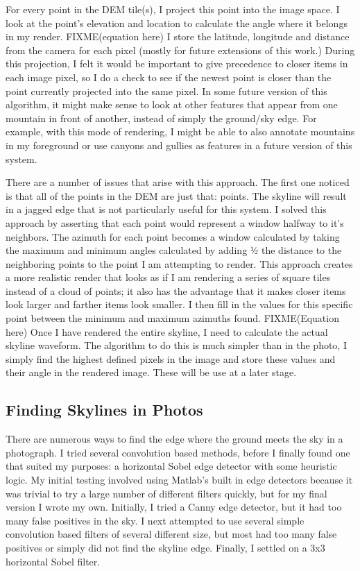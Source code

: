 \documentclass{acm_proc_article-sp}
\begin{document}
For every point in the DEM tile(s), I project this point into the image space.  I look at the point’s elevation and location to calculate the angle where it belongs in my render.  FIXME(equation here) I store the latitude, longitude and distance from the camera for each pixel (mostly for future extensions of this work.) During this projection, I felt it would be important to give precedence to closer items in each image pixel, so I do a check to see if the newest point is closer than the point currently projected into the same pixel.  In some future version of this algorithm, it might make sense to look at other features that appear from one mountain in front of another, instead of simply the ground/sky edge. For example, with this mode of rendering, I might be able to also annotate mountains in my foreground or use canyons and gullies as features in a future version of this system.

There are a number of issues that arise with this approach.  The first one noticed is that all of the points in the DEM are just that: points.  The skyline will result in a jagged edge that is not particularly useful for this system.  I solved this approach by asserting that each point would represent a window halfway to it’s neighbors.  The azimuth for each point becomes a window calculated by taking the maximum and minimum angles calculated by adding ½ the distance to the neighboring points to the point I am attempting to render.  This approach creates a more realistic render that looks as if I am rendering a series of square tiles instead of a cloud of points; it also has the advantage that it makes closer items look larger and farther items look smaller.  I then fill in the values for this specific point between the minimum and maximum azimuths found. FIXME(Equation here)
    Once I have rendered the entire skyline, I need to calculate the actual skyline waveform.  The algorithm to do this is much simpler than in the photo, I simply find the highest defined pixels in the image and store these values and their angle in the rendered image. These will be use at a later stage.
\subsection{Finding Skylines in Photos}
    There are numerous ways to find the edge where the ground meets the sky in a photograph.  I tried several convolution based methods, before I finally found one that suited my purposes:  a horizontal Sobel edge detector with some heuristic logic.  My initial testing involved using Matlab’s built in edge detectors \cite{mcandrew2004introduction} because it was trivial to try a large number of different filters quickly, but for my final version I wrote my own.  Initially, I tried a Canny edge detector, but it had too many false positives in the sky.  I next attempted to use several simple convolution \cite{Schafer:DSP} based filters of several different size, but most had too many false positives or simply did not find the skyline edge.  Finally, I settled on a 3x3 horizontal Sobel filter. \cite{behringer2002registration}  
\end{document}
